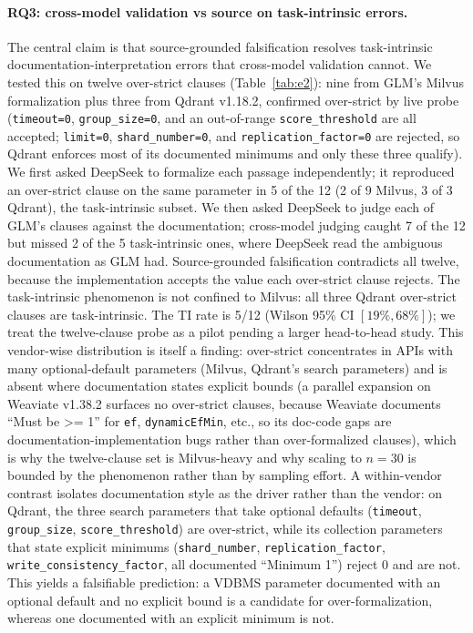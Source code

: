 \documentclass[sigconf]{acmart}
\begin{document}
\paragraph{RQ3: cross-model validation vs source on task-intrinsic errors.}
The central claim is that source-grounded falsification resolves task-intrinsic documentation-interpretation errors that cross-model validation cannot. We tested this on twelve over-strict clauses (Table~\ref{tab:e2}): nine from GLM's Milvus formalization plus three from Qdrant v1.18.2, confirmed over-strict by live probe (\texttt{timeout=0}, \texttt{group\_size=0}, and an out-of-range \texttt{score\_threshold} are all accepted; \texttt{limit=0}, \texttt{shard\_number=0}, and \texttt{replication\_factor=0} are rejected, so Qdrant enforces most of its documented minimums and only these three qualify). We first asked DeepSeek to formalize each passage independently; it reproduced an over-strict clause on the same parameter in 5 of the 12 (2 of 9 Milvus, 3 of 3 Qdrant), the task-intrinsic subset. We then asked DeepSeek to judge each of GLM's clauses against the documentation; cross-model judging caught 7 of the 12 but missed 2 of the 5 task-intrinsic ones, where DeepSeek read the ambiguous documentation as GLM had. Source-grounded falsification contradicts all twelve, because the implementation accepts the value each over-strict clause rejects. The task-intrinsic phenomenon is not confined to Milvus: all three Qdrant over-strict clauses are task-intrinsic. The TI rate is 5/12 (Wilson 95\% CI $[19\%, 68\%]$); we treat the twelve-clause probe as a pilot pending a larger head-to-head study. This vendor-wise distribution is itself a finding: over-strict concentrates in APIs with many optional-default parameters (Milvus, Qdrant's search parameters) and is absent where documentation states explicit bounds (a parallel expansion on Weaviate v1.38.2 surfaces no over-strict clauses, because Weaviate documents ``Must be >= 1'' for \texttt{ef}, \texttt{dynamicEfMin}, etc., so its doc-code gaps are documentation-implementation bugs rather than over-formalized clauses), which is why the twelve-clause set is Milvus-heavy and why scaling to $n{=}30$ is bounded by the phenomenon rather than by sampling effort. A within-vendor contrast isolates documentation style as the driver rather than the vendor: on Qdrant, the three search parameters that take optional defaults (\texttt{timeout}, \texttt{group\_size}, \texttt{score\_threshold}) are over-strict, while its collection parameters that state explicit minimums (\texttt{shard\_number}, \texttt{replication\_factor}, \texttt{write\_consistency\_factor}, all documented ``Minimum 1'') reject 0 and are not. This yields a falsifiable prediction: a VDBMS parameter documented with an optional default and no explicit bound is a candidate for over-formalization, whereas one documented with an explicit minimum is not.
\end{document}
